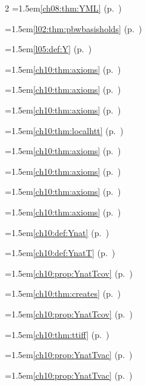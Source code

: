 \begin{multicols}{2}
\hangindent=1.5em\quad \ref{ch08:thm:YML} (p.~\pageref{ch08:thm:YML})\par
\hangindent=1.5em\quad \ref{l02:thm:pbwbasisholds} (p.~\pageref{l02:thm:pbwbasisholds})\par
\hangindent=1.5em\quad \ref{l05:def:Y} (p.~\pageref{l05:def:Y})\par
\hangindent=1.5em\quad \ref{ch10:thm:axioms} (p.~\pageref{ch10:thm:axioms})\par
\hangindent=1.5em\quad \ref{ch10:thm:axioms} (p.~\pageref{ch10:thm:axioms})\par
\hangindent=1.5em\quad \ref{ch10:thm:axioms} (p.~\pageref{ch10:thm:axioms})\par
\hangindent=1.5em\quad \ref{ch10:thm:localhtt} (p.~\pageref{ch10:thm:localhtt})\par
\hangindent=1.5em\quad \ref{ch10:thm:axioms} (p.~\pageref{ch10:thm:axioms})\par
\hangindent=1.5em\quad \ref{ch10:thm:axioms} (p.~\pageref{ch10:thm:axioms})\par
\hangindent=1.5em\quad \ref{ch10:thm:axioms} (p.~\pageref{ch10:thm:axioms})\par
\hangindent=1.5em\quad \ref{ch10:thm:axioms} (p.~\pageref{ch10:thm:axioms})\par
\hangindent=1.5em\quad \ref{ch10:def:Ynat} (p.~\pageref{ch10:def:Ynat})\par
\hangindent=1.5em\quad \ref{ch10:def:YnatT} (p.~\pageref{ch10:def:YnatT})\par
\hangindent=1.5em\quad \ref{ch10:prop:YnatTcov} (p.~\pageref{ch10:prop:YnatTcov})\par
\hangindent=1.5em\quad \ref{ch10:thm:creates} (p.~\pageref{ch10:thm:creates})\par
\hangindent=1.5em\quad \ref{ch10:prop:YnatTcov} (p.~\pageref{ch10:prop:YnatTcov})\par
\hangindent=1.5em\quad \ref{ch10:thm:ttiff} (p.~\pageref{ch10:thm:ttiff})\par
\hangindent=1.5em\quad \ref{ch10:prop:YnatTvac} (p.~\pageref{ch10:prop:YnatTvac})\par
\hangindent=1.5em\quad \ref{ch10:prop:YnatTvac} (p.~\pageref{ch10:prop:YnatTvac})\par

\end{multicols}
